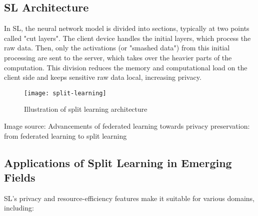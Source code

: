 \subsection{SL Architecture}
\label{sec:sl_architecture}

In \gls{SL}, the neural network model is divided into sections, typically at two points called "cut layers". The client device handles the initial layers, which process the raw data. Then, only the activations (or "smashed data") from this initial processing are sent to the server, which takes over the heavier parts of the computation. This division reduces the memory and computational load on the client side and keeps sensitive raw data local, increasing privacy.


\begin{figure}[H]
  \centering
  \texttt{[image: split-learning]}
  \caption{Illustration of split learning architecture}
  \label{fig:DFL_CFL_DL_LL}
\end{figure}


Image source: Advancements of federated learning towards privacy preservation: from federated learning to split learning

\subsection{Applications of Split Learning in Emerging Fields}
\label{sec:application_of_sl_in_emerging_fields}


SL's privacy and resource-efficiency features make it suitable for various domains, including:

